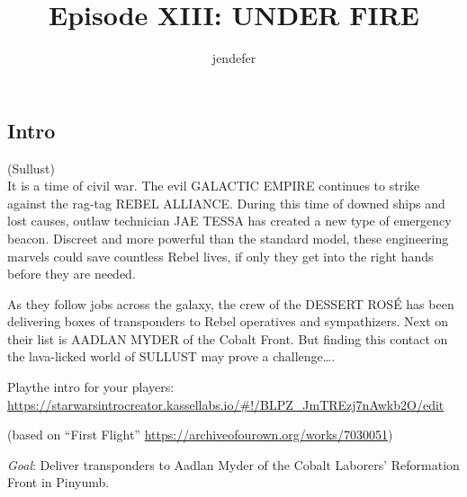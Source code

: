 \documentclass{book}
\title{Episode XIII: UNDER FIRE}
\author{jendefer}
\begin{document}
\maketitle

\begin{multicols}{2}
\section{Intro}
(Sullust)\\

It is a time of civil war. The evil GALACTIC EMPIRE continues to strike against the rag-tag REBEL ALLIANCE. During this time of downed ships and lost causes, outlaw technician JAE TESSA has created a new type of emergency beacon. Discreet and more powerful than the standard model, these engineering marvels could save countless Rebel lives, if only they get into the right hands before they are needed.

As they follow jobs across the galaxy, the crew of the DESSERT ROSÉ has been delivering boxes of transponders to Rebel operatives and sympathizers. Next on their list is AADLAN MYDER of the Cobalt Front. But finding this contact on the lava-licked world of SULLUST may prove a challenge….

Playthe intro for your players: \url{https://starwarsintrocreator.kassellabs.io/#!/BLPZ_JmTREzj7nAwkb2O/edit}

(based on ``First Flight'' \url{https://archiveofourown.org/works/7030051})

\emph{Goal}: Deliver transponders to Aadlan Myder of the Cobalt Laborers’ Reformation Front in Pinyumb.\\


\end{multicols}
\end{document}
